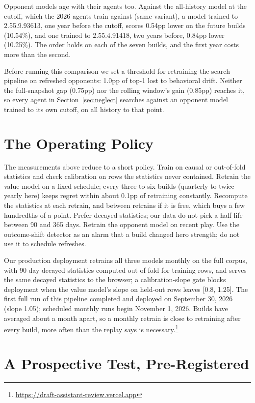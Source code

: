 \documentclass[journal]{IEEEtran}
\newcommand{\deployurl}{\url{https://draft-assistant-review.vercel.app}}
\newcommand{\deployurl}{\url{https://www.hotsfever.com}}
\begin{document}
Opponent models age with their agents too. Against the all-history
model at the cutoff, which the 2026 agents train against (same variant),
a model trained to 2.55.9.93613, one year before the cutoff, scores
0.54pp lower on the future builds (10.54\%), and one trained to
2.55.4.91418, two years before, 0.84pp lower (10.25\%). The order holds
on each of the seven builds, and the first year costs more than the
second.

Before running this comparison we set a threshold for retraining the
search pipeline on refreshed opponents: 1.0pp of top-1 lost to
behavioral drift. Neither the full-snapshot gap (0.75pp) nor the rolling
window's gain (0.85pp) reaches it, so every agent in
Section~\ref{sec:neglect} searches against an opponent model trained to
its own cutoff, on all history to that point.

\section{The Operating Policy}
\label{sec:operating}

The measurements above reduce to a short policy. Train on causal or
out-of-fold statistics and check calibration on rows the statistics
never contained. Retrain the value model on a fixed schedule; every
three to six builds (quarterly to twice yearly here) keeps regret within
about 0.1pp of retraining constantly. Recompute the statistics at each
retrain, and between retrains if it is free, which buys a few hundredths
of a point. Prefer decayed statistics; our data do not pick a half-life
between 90 and 365 days. Retrain the opponent model
on recent play. Use the outcome-shift detector as an alarm that a
build changed hero strength; do not use it to schedule refreshes.

Our production deployment retrains all three models monthly on the full
corpus, with 90-day decayed statistics computed out of fold for training
rows, and serves the same decayed statistics to the browser; a
calibration-slope gate blocks deployment when the value model's slope on
held-out rows leaves [0.8, 1.25]. The first full run of this pipeline
completed and deployed on September 30, 2026 (slope 1.05); scheduled
monthly runs begin November 1, 2026. Builds have averaged about a month
apart, so a monthly retrain is close to retraining after every build,
more often than the replay says is necessary.\footnote{\deployurl}

\section{A Prospective Test, Pre-Registered}
\label{sec:prospective}
\end{document}
